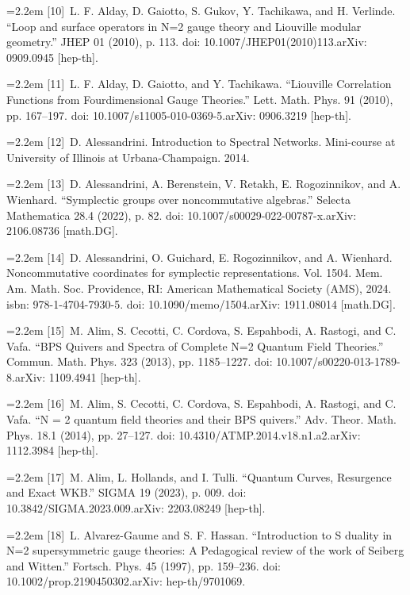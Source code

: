 \noindent\hangindent=2.2em [10]\ L. F. Alday, D. Gaiotto, S. Gukov, Y. Tachikawa, and H. Verlinde. “Loop and surface operators in N=2 gauge theory and Liouville modular geometry.” JHEP 01 (2010), p. 113. doi: 10.1007/JHEP01(2010)113.arXiv: 0909.0945 [hep-th].\par
\noindent\hangindent=2.2em [11]\ L. F. Alday, D. Gaiotto, and Y. Tachikawa. “Liouville Correlation Functions from Fourdimensional Gauge Theories.” Lett. Math. Phys. 91 (2010), pp. 167--197. doi: 10.1007/s11005-010-0369-5.arXiv: 0906.3219 [hep-th].\par
\noindent\hangindent=2.2em [12]\ D. Alessandrini. Introduction to Spectral Networks. Mini-course at University of Illinois at Urbana-Champaign. 2014.\par
\noindent\hangindent=2.2em [13]\ D. Alessandrini, A. Berenstein, V. Retakh, E. Rogozinnikov, and A. Wienhard. “Symplectic groups over noncommutative algebras.” Selecta Mathematica 28.4 (2022), p. 82. doi: 10.1007/s00029-022-00787-x.arXiv: 2106.08736 [math.DG].\par
\noindent\hangindent=2.2em [14]\ D. Alessandrini, O. Guichard, E. Rogozinnikov, and A. Wienhard. Noncommutative coordinates for symplectic representations. Vol. 1504. Mem. Am. Math. Soc. Providence, RI: American Mathematical Society (AMS), 2024. isbn: 978-1-4704-7930-5. doi: 10.1090/memo/1504.arXiv: 1911.08014 [math.DG].\par
\noindent\hangindent=2.2em [15]\ M. Alim, S. Cecotti, C. Cordova, S. Espahbodi, A. Rastogi, and C. Vafa. “BPS Quivers and Spectra of Complete N=2 Quantum Field Theories.” Commun. Math. Phys. 323 (2013), pp. 1185--1227. doi: 10.1007/s00220-013-1789-8.arXiv: 1109.4941 [hep-th].\par
\noindent\hangindent=2.2em [16]\ M. Alim, S. Cecotti, C. Cordova, S. Espahbodi, A. Rastogi, and C. Vafa. “N = 2 quantum field theories and their BPS quivers.” Adv. Theor. Math. Phys. 18.1 (2014), pp. 27--127. doi: 10.4310/ATMP.2014.v18.n1.a2.arXiv: 1112.3984 [hep-th].\par
\noindent\hangindent=2.2em [17]\ M. Alim, L. Hollands, and I. Tulli. “Quantum Curves, Resurgence and Exact WKB.” SIGMA 19 (2023), p. 009. doi: 10.3842/SIGMA.2023.009.arXiv: 2203.08249 [hep-th].\par
\noindent\hangindent=2.2em [18]\ L. Alvarez-Gaume and S. F. Hassan. “Introduction to S duality in N=2 supersymmetric gauge theories: A Pedagogical review of the work of Seiberg and Witten.” Fortsch. Phys. 45 (1997), pp. 159--236. doi: 10.1002/prop.2190450302.arXiv: hep-th/9701069.\par

